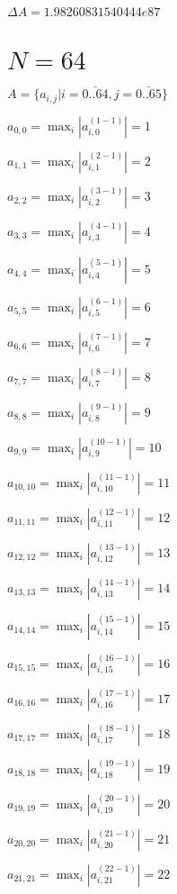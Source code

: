 \documentclass[a4paper,12pt]{article}
\begin{document}
$\Delta A = 1.98260831540444e87$



\section{ $N = 64$ }
$A = \{ a _{ i, j } | i = \bar { 0..64 }, j = \bar { 0..65 } \}$

$a _{ 0, 0 } =  \max _i |a _{ i, 0 } ^{ (1 - 1) } | = 1$

$a _{ 1, 1 } =  \max _i |a _{ i, 1 } ^{ (2 - 1) } | = 2$

$a _{ 2, 2 } =  \max _i |a _{ i, 2 } ^{ (3 - 1) } | = 3$

$a _{ 3, 3 } =  \max _i |a _{ i, 3 } ^{ (4 - 1) } | = 4$

$a _{ 4, 4 } =  \max _i |a _{ i, 4 } ^{ (5 - 1) } | = 5$

$a _{ 5, 5 } =  \max _i |a _{ i, 5 } ^{ (6 - 1) } | = 6$

$a _{ 6, 6 } =  \max _i |a _{ i, 6 } ^{ (7 - 1) } | = 7$

$a _{ 7, 7 } =  \max _i |a _{ i, 7 } ^{ (8 - 1) } | = 8$

$a _{ 8, 8 } =  \max _i |a _{ i, 8 } ^{ (9 - 1) } | = 9$

$a _{ 9, 9 } =  \max _i |a _{ i, 9 } ^{ (10 - 1) } | = 10$

$a _{ 10, 10 } =  \max _i |a _{ i, 10 } ^{ (11 - 1) } | = 11$

$a _{ 11, 11 } =  \max _i |a _{ i, 11 } ^{ (12 - 1) } | = 12$

$a _{ 12, 12 } =  \max _i |a _{ i, 12 } ^{ (13 - 1) } | = 13$

$a _{ 13, 13 } =  \max _i |a _{ i, 13 } ^{ (14 - 1) } | = 14$

$a _{ 14, 14 } =  \max _i |a _{ i, 14 } ^{ (15 - 1) } | = 15$

$a _{ 15, 15 } =  \max _i |a _{ i, 15 } ^{ (16 - 1) } | = 16$

$a _{ 16, 16 } =  \max _i |a _{ i, 16 } ^{ (17 - 1) } | = 17$

$a _{ 17, 17 } =  \max _i |a _{ i, 17 } ^{ (18 - 1) } | = 18$

$a _{ 18, 18 } =  \max _i |a _{ i, 18 } ^{ (19 - 1) } | = 19$

$a _{ 19, 19 } =  \max _i |a _{ i, 19 } ^{ (20 - 1) } | = 20$

$a _{ 20, 20 } =  \max _i |a _{ i, 20 } ^{ (21 - 1) } | = 21$

$a _{ 21, 21 } =  \max _i |a _{ i, 21 } ^{ (22 - 1) } | = 22$
\end{document}
